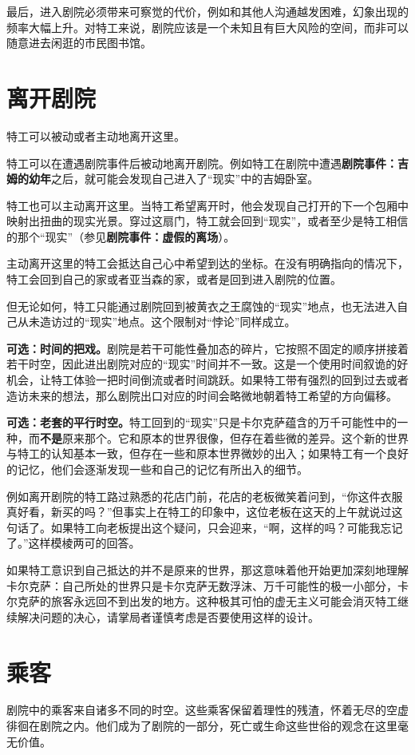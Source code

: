 最后，进入剧院必须带来可察觉的代价，例如和其他人沟通越发困难，幻象出现的频率大幅上升。对特工来说，剧院应该是一个未知且有巨大风险的空间，而非可以随意进去闲逛的市民图书馆。

\section{离开剧院}
特工可以被动或者主动地离开这里。

特工可以在遭遇剧院事件后被动地离开剧院。例如特工在剧院中遭遇\textbf{剧院事件：吉姆的幼年}之后，就可能会发现自己进入了“现实”中的吉姆卧室。

特工也可以主动离开这里。当特工希望离开时，他会发现自己打开的下一个包厢中映射出扭曲的现实光景。穿过这扇门，特工就会回到“现实”，或者至少是特工相信的那个“现实”（参见\textbf{剧院事件：虚假的离场}）。

主动离开这里的特工会抵达自己心中希望到达的坐标。在没有明确指向的情况下，特工会回到自己的家或者亚当森的家，或者是回到进入剧院的位置。

但无论如何，特工只能通过剧院回到被黄衣之王腐蚀的“现实”地点，也无法进入自己从未造访过的“现实”地点。这个限制对“悖论”同样成立。

\textbf{可选：时间的把戏。}剧院是若干可能性叠加态的碎片，它按照不固定的顺序拼接着若干时空，因此进出剧院对应的“现实”时间并不一致。这是一个使用时间叙诡的好机会，让特工体验一把时间倒流或者时间跳跃。如果特工带有强烈的回到过去或者造访未来的想法，那么剧院出口对应的时间会略微地朝着特工希望的方向偏移。

\textbf{可选：老套的平行时空。}特工回到的“现实”只是卡尔克萨蕴含的万千可能性中的一种，而\textbf{不是}原来那个。它和原本的世界很像，但存在着些微的差异。这个新的世界与特工的认知基本一致，但存在一些和原本世界微妙的出入；如果特工有一个良好的记忆，他们会逐渐发现一些和自己的记忆有所出入的细节。

例如离开剧院的特工路过熟悉的花店门前，花店的老板微笑着问到，“你这件衣服真好看，新买的吗？”但事实上在特工的印象中，这位老板在这天的上午就说过这句话了。如果特工向老板提出这个疑问，只会迎来，“啊，这样的吗？可能我忘记了。”这样模棱两可的回答。

如果特工意识到自己抵达的并不是原来的世界，那这意味着他开始更加深刻地理解卡尔克萨：自己所处的世界只是卡尔克萨无数浮沫、万千可能性的极一小部分，卡尔克萨的旅客永远回不到出发的地方。这种极其可怕的虚无主义可能会消灭特工继续解决问题的决心，请掌局者谨慎考虑是否要使用这样的设计。

\section{乘客}
剧院中的乘客来自诸多不同的时空。这些乘客保留着理性的残渣，怀着无尽的空虚徘徊在剧院之内。他们成为了剧院的一部分，死亡或生命这些世俗的观念在这里毫无价值。

